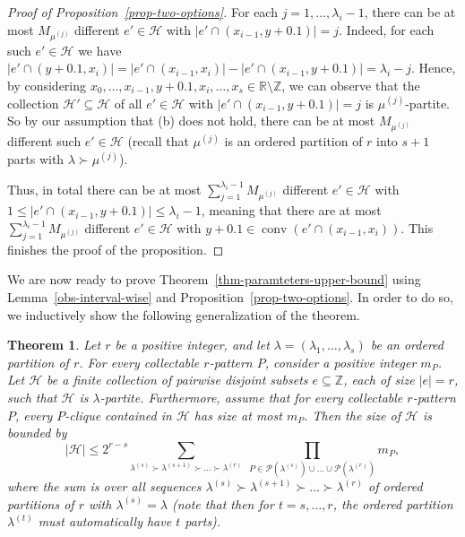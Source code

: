 \documentclass{aic}
\newtheorem{theorem}{Theorem}[section]
\theoremstyle{definition}
\numberwithin{equation}{section}
\numberwithin{figure}{section}
\newcommand{\su}{\subseteq}
\newcommand{\sm}{\setminus}
\newcommand{\Z}{\mathbb{Z}}
\newcommand{\HH}{\mathcal{H}}
\newcommand{\conv}{\operatorname{conv}}
\newcommand{\PP}{\mathcal{P}}
\begin{document}
\begin{proof}[Proof of Proposition~\ref{prop-two-options}]
For each $j=1,\dots,\lambda_i-1$, there can be at most $M_{\mu^{(j)}}$ different $e'\in\HH$ with $|e'\cap (x_{i-1},y+0.1)|=j$. Indeed, for each such $e'\in\HH$ we have $|e'\cap (y+0.1,x_i)|=|e'\cap (x_{i-1},x_i)|-|e'\cap (x_{i-1},y+0.1)|=\lambda_i-j$. Hence, by considering $x_0,\dots,x_{i-1}, y+0.1,x_i,\dots,x_s\in \mathbb{R}\sm \Z$, we can observe that the collection $\HH'\su \HH$ of all $e'\in\HH$ with $|e'\cap (x_{i-1},y+0.1)|=j$ is $\mu^{(j)}$-partite. So by our assumption that (b) does not hold, there can be at most $M_{\mu^{(j)}}$ different such $e'\in\HH$ (recall that $\mu^{(j)}$ is an ordered partition of $r$ into $s+1$ parts with $\lambda\succ \mu^{(j)}$).

Thus, in total there can be at most $\sum_{j=1}^{\lambda_i-1} M_{\mu^{(j)}}$ different $e'\in\HH$ with $1\le |e'\cap (x_{i-1},y+0.1)|\le \lambda_i-1$, meaning that there are at most $\sum_{j=1}^{\lambda_i-1} M_{\mu^{(j)}}$ different $e'\in\HH$ with $y+0.1\in \conv(e'\cap (x_{i-1},x_i))$. This finishes the proof of the proposition.
\end{proof}

We are now ready to prove Theorem~\ref{thm-paramteters-upper-bound} using Lemma~\ref{obs-interval-wise} and Proposition~\ref{prop-two-options}. In order to do so, we inductively show the following generalization of the theorem.

\begin{theorem} \label{thm-induction-upper-bound}
Let $r$ be a positive integer, and let $\lambda=(\lambda_1,\dots,\lambda_s)$ be an ordered partition of $r$. For every collectable $r$-pattern $P$, consider a positive integer $m_P$. Let $\HH$ be a finite collection of pairwise disjoint subsets $e\su \Z$, each of size $|e|=r$, such that $\HH$ is $\lambda$-partite. Furthermore, assume that for every collectable $r$-pattern $P$, every $P$-clique contained in $\HH$ has size at most $m_P$. Then the size of $\HH$ is bounded by
\begin{equation}
    |\HH|\le 2^{r-s} \sum_{\lambda^{(s)} \succ \lambda^{(s+1)} \succ \dots \succ \lambda^{(r)}}\ \prod_{ P\in \PP(\lambda^{(s)})\cup\dots\cup \PP(\lambda^{(r)}) } m_{P},
\end{equation}
where the sum is over all sequences $\lambda^{(s)} \succ \lambda^{(s+1)} \succ \dots \succ \lambda^{(r)}$ of ordered partitions of $r$ with $\lambda^{(s)}=\lambda$ (note that then for $t=s,\dots,r$, the ordered partition $\lambda^{(t)}$ must automatically have $t$ parts).
\end{theorem}
\end{document}
